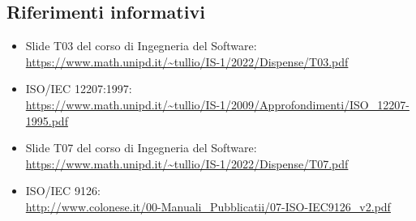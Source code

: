 \subsection{Riferimenti informativi}
\begin{itemize}
    \item Slide T03 del corso di Ingegneria del Software: \\ \url{https://www.math.unipd.it/~tullio/IS-1/2022/Dispense/T03.pdf}
    \item ISO/IEC 12207:1997: \\ \url{https://www.math.unipd.it/~tullio/IS-1/2009/Approfondimenti/ISO_12207-1995.pdf}
    \item Slide T07 del corso di Ingegneria del Software: \\ \url{https://www.math.unipd.it/~tullio/IS-1/2022/Dispense/T07.pdf}
    \item ISO/IEC 9126: \\ \url{http://www.colonese.it/00-Manuali_Pubblicatii/07-ISO-IEC9126_v2.pdf}
\end{itemize}
